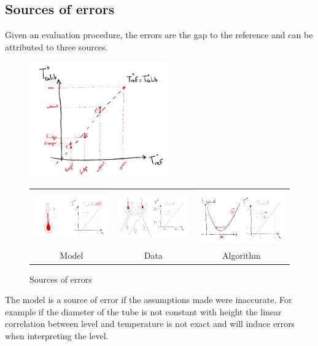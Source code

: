 \begin{bibunit}
 \subsection{Sources of errors}

Given an evaluation procedure, the errors are the gap to the reference and can be attributed to three sources.

\begin{figure}
\includegraphics[clip, width=6cm]{Introduction/pics/errors.png}  
\begin{tabular}{c |c|c}

     \hspace{-.15\linewidth}\includegraphics[width=.4\linewidth]{Introduction/pics/model_err_w_source.png}  &
     \includegraphics[width=.4\linewidth]{Introduction/pics/data_err_w_source.png} &
     \includegraphics[width=.4\linewidth]{Introduction/pics/optim_err_w_source.png} \\
     \hspace{-.15\linewidth}Model &  Data &  Algorithm \\
\end{tabular}
    \centering
    \caption{Sources of errors}
    \label{fig:err_sources}
\end{figure}
 The model is a source of error if the assumptions made were inaccurate. For example if the diameter of the tube is not constant with height the linear correlation between level and temperature is not exact and will induce errors when interpreting the level.


\end{bibunit}
